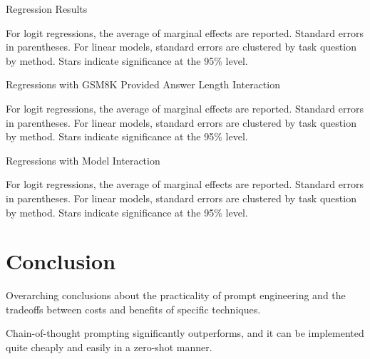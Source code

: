 \documentclass[11pt]{article}
\begin{document}

\begin{table}
  \caption{Regression Results}
  \centering
  \tiny
    
  \label{tab:regressions}
  \newline \newline \footnotesize For logit regressions, the average of marginal effects are reported. Standard errors in parentheses. For linear models, standard errors are clustered by task question by method. Stars indicate significance at the 95\% level.
\end{table}

\begin{table}
  \caption{Regressions with GSM8K Provided Answer Length Interaction}
  \centering
  \tiny
    
  \label{tab:regressions_provided_interaction}
  \newline \newline \footnotesize For logit regressions, the average of marginal effects are reported. Standard errors in parentheses. For linear models, standard errors are clustered by task question by method. Stars indicate significance at the 95\% level.
\end{table}

\begin{table}
  \caption{Regressions with Model Interaction}
  \centering
  \tiny
    
  \label{tab:regressions_model_interaction}
  \newline \newline \footnotesize For logit regressions, the average of marginal effects are reported. Standard errors in parentheses. For linear models, standard errors are clustered by task question by method. Stars indicate significance at the 95\% level.
\end{table}


\section*{Conclusion}

Overarching conclusions about the practicality of prompt engineering and the tradeoffs between costs and benefits of specific techniques.

Chain-of-thought prompting significantly outperforms, and it can be implemented quite cheaply and easily in a zero-shot manner.
\end{document}
